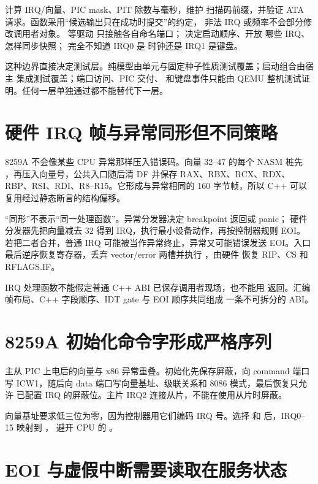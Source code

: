  计算 IRQ/向量、PIC mask、PIT 除数与毫秒，维护
扫描码前缀，并验证 ATA 请求。函数采用“候选输出只在成功时提交”的约定，
非法 IRQ 或频率不会部分修改调用者对象。 等驱动
只接触各自命名端口； 决定启动顺序、开放
哪些 IRQ、怎样同步快照； 完全不知道 IRQ0 是
时钟还是 IRQ1 是键盘。

这种边界直接决定测试层。纯模型由单元与固定种子性质测试覆盖；启动组合由宿主
集成测试覆盖；端口访问、PIC 交付、 和键盘事件只能由 QEMU
整机测试证明。任何一层单独通过都不能替代下一层。

\section{硬件 IRQ 帧与异常同形但不同策略}

8259A 不会像某些 CPU 异常那样压入错误码。向量 32--47 的每个 NASM 桩先
，再压入向量号，公共入口随后清 DF 并保存
RAX、RBX、RCX、RDX、RBP、RSI、RDI、R8--R15。它形成与异常相同的
160 字节帧，所以 C++ 可以复用经过静态断言的结构偏移。

“同形”不表示“同一处理函数”。异常分发器决定 breakpoint 返回或 panic；
硬件分发器先把向量减去 32 得到 IRQ，执行最小设备动作，再按控制器规则 EOI。
若把二者合并，普通 IRQ 可能被当作异常终止，异常又可能错误发送 EOI。入口
最后逆序恢复寄存器，丢弃 vector/error 两槽并执行 ，由硬件
恢复 RIP、CS 和 RFLAGS.IF。

\begin{contractbox}
IRQ 处理函数不能假定普通 C++ ABI 已保存调用者现场，也不能用
 返回。汇编帧布局、C++ 字段顺序、IDT gate 与 EOI 顺序共同组成
一条不可拆分的 ABI。
\end{contractbox}

\section{8259A 初始化命令字形成严格序列}

主从 PIC 上电后的向量与 x86 异常重叠。初始化先保存屏蔽，向 command 端口
写 ICW1，随后向 data 端口写向量基址、级联关系和 8086 模式，最后恢复只允许
已配置 IRQ 的屏蔽位。主片 IRQ2 连接从片，不能在使用从片时屏蔽。

向量基址要求低三位为零，因为控制器用它们编码 IRQ 号。选择
 和  后，IRQ0--15 映射到 ，
避开 CPU 的 。

\section{EOI 与虚假中断需要读取在服务状态}

